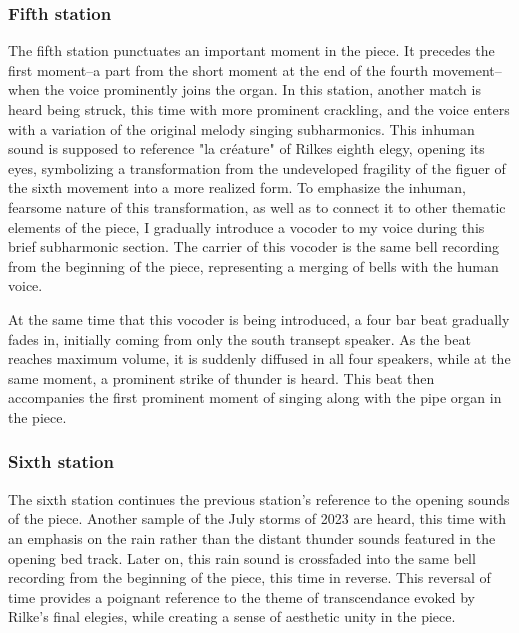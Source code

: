 \documentclass[12pt,twoside,maitrise]{dms_ks}
\theoremstyle{definition}
\begin{document}
\subsubsection{Fifth station}

The fifth station punctuates an important moment in the piece. It precedes the first moment–a part from the short moment at the end of the fourth movement–when the voice prominently joins the organ. In this station, another match is heard being struck, this time with more prominent crackling, and the voice enters with a variation of the original melody singing subharmonics. This inhuman sound is supposed to reference "la créature" of Rilkes eighth elegy, opening its eyes, symbolizing a transformation from the undeveloped fragility of the figuer of the sixth movement into a more realized form. To emphasize the inhuman, fearsome nature of this transformation, as well as to connect it to other thematic elements of the piece, I gradually introduce a vocoder to my voice during this brief subharmonic section. The carrier of this vocoder is the same bell recording from the beginning of the piece, representing a merging of bells with the human voice.

At the same time that this vocoder is being introduced, a four bar beat gradually fades in, initially coming from only the south transept speaker. As the beat reaches maximum volume, it is suddenly diffused in all four speakers, while at the same moment, a prominent strike of thunder is heard. This beat then accompanies the first prominent moment of singing along with the pipe organ in the piece.


\subsubsection{Sixth station}
The sixth station continues the previous station's reference to the opening sounds of the piece. Another sample of the July storms of 2023 are heard, this time with an emphasis on the rain rather than the distant thunder sounds featured in the opening bed track. Later on, this rain sound is crossfaded into the same bell recording from the beginning of the piece, this time in reverse. This reversal of time provides a poignant reference to the theme of transcendance evoked by Rilke's final elegies, while creating a sense of aesthetic unity in the piece.
\end{document}

